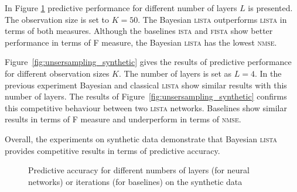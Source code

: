 \documentclass[letterpaper]{article}
\begin{document}
In Figure \ref{fig:number_of_layers_synthetic} predictive performance for different number of layers $L$ is presented. The observation size is set to $K=50$. The Bayesian \textsc{lista} outperforms \textsc{lista} in terms of both measures. Although the baselines \textsc{ista} and \textsc{fista} show better performance in terms of F measure, the Bayesian \textsc{lista} has the lowest \textsc{nmse}.

Figure~\ref{fig:unsersampling_synthetic} gives the results of predictive performance for different observation sizes $K$. The number of layers is set as $L=4$. In the previous experiment Bayesian and classical \textsc{lista} show similar results with this number of layers. The results of Figure~\ref{fig:unsersampling_synthetic} confirms this competitive behaviour between two \textsc{lista} networks. Baselines show similar results in terms of F measure and underperform in terms of \textsc{nmse}.

Overall, the experiments on synthetic data demonstrate that Bayesian \textsc{lista} provides competitive results in terms of predictive accuracy.

\begin{figure}[t]
\centering
\caption{Predictive accuracy for different numbers of layers (for neural networks) or iterations (for baselines) on the synthetic data}
\label{fig:number_of_layers_synthetic}
\end{figure}
\end{document}
